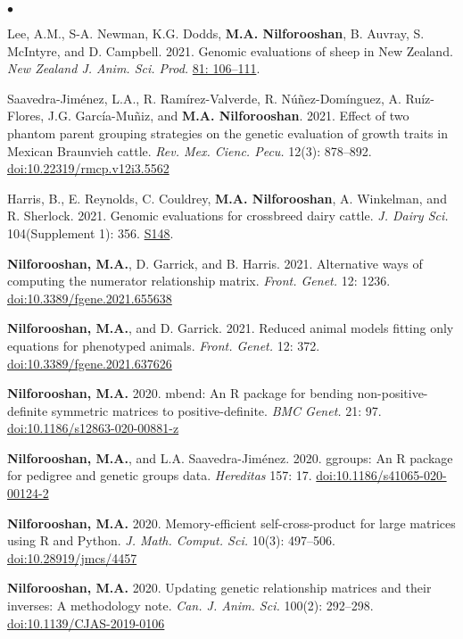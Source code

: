 \documentclass[margin,line]{res}
\newenvironment{list2}{
  \begin{list}{$\bullet$}{%
      \setlength{\itemsep}{0in}
      \setlength{\parsep}{0in} \setlength{\parskip}{0in}
      \setlength{\topsep}{0in} \setlength{\partopsep}{0in}
      \setlength{\leftmargin}{0.2in}}}{\end{list}}
\begin{document}
\begin{resume}
\begin{list2}
\item Lee, A.M., S-A. Newman, K.G. Dodds, {\bf M.A. Nilforooshan}, B. Auvray, S. McIntyre, and D. Campbell. 2021. Genomic evaluations of sheep in New Zealand. {\em New Zealand J. Anim. Sci. Prod.} \href{http://www.nzsap.org/proceedings/genomic-evaluations-sheep-new-zealand}{81: 106--111}.
\item Saavedra-Jim\'{e}nez, L.A., R. Ram\'{i}rez-Valverde, R. N\'{u}\~{n}ez-Dom\'{i}nguez, A. Ru\'{i}z-Flores, J.G. Garc\'{i}a-Mu\~{n}iz, and {\bf M.A. Nilforooshan}. 2021. Effect of two phantom parent grouping strategies on the genetic evaluation of growth traits in Mexican Braunvieh cattle. {\em Rev. Mex. Cienc. Pecu.} 12(3): 878--892. \href{https://doi.org/10.22319/rmcp.v12i3.5562}{doi:10.22319/rmcp.v12i3.5562}
\item Harris, B., E. Reynolds, C. Couldrey, {\bf M.A. Nilforooshan}, A. Winkelman, and R. Sherlock. 2021. Genomic evaluations for crossbreed dairy cattle. {\em J. Dairy Sci.} 104(Supplement 1): 356. \href{https://www.adsa.org/Portals/0/SiteContent/Docs/Meetings/2021ADSA/ADSA2021_Abstracts.pdf}{S148}.
\item {\bf Nilforooshan, M.A.}, D. Garrick, and B. Harris. 2021. Alternative ways of computing the numerator relationship matrix. {\em Front. Genet.} 12: 1236. \href{https://doi.org/10.3389/fgene.2021.655638}{doi:10.3389/fgene.2021.655638}
\item {\bf Nilforooshan, M.A.}, and D. Garrick. 2021. Reduced animal models fitting only equations for phenotyped animals. {\em Front. Genet.} 12: 372. \href{https://doi.org/10.3389/fgene.2021.637626}{doi:10.3389/fgene.2021.637626}
\item {\bf Nilforooshan, M.A.} 2020. mbend: An R package for bending non-positive-deﬁnite symmetric matrices to positive-deﬁnite. {\em BMC Genet.} 21: 97. \href{https://doi.org/10.1186/s12863-020-00881-z}{doi:10.1186/s12863-020-00881-z}
\item {\bf Nilforooshan, M.A.}, and L.A. Saavedra-Jim\'{e}nez. 2020. ggroups: An R package for pedigree and genetic groups data. {\em Hereditas} 157: 17. \href{https://doi.org/10.1186/s41065-020-00124-2}{doi:10.1186/s41065-020-00124-2}
\item {\bf Nilforooshan, M.A.} 2020. Memory-efficient self-cross-product for large matrices using R and Python. {\em J. Math. Comput. Sci.} 10(3): 497--506. \href{https://doi.org/10.28919/jmcs/4457}{doi:10.28919/jmcs/4457}
\item {\bf Nilforooshan, M.A.} 2020. Updating genetic relationship matrices and their inverses: A methodology note. {\em Can. J. Anim. Sci.} 100(2): 292--298. \href{https://doi.org/10.1139/CJAS-2019-0106}{doi:10.1139/CJAS-2019-0106}

\end{list2}
\end{resume}
\end{document}
